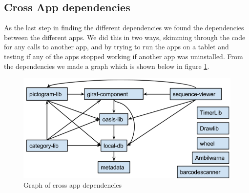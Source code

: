\subsection{Cross App dependencies}
As the last step in finding the different dependencies we found the dependencies between the different apps. We did this in two ways, skimming through the code for any calls to another app, and by trying to run the apps on a tablet and testing if any of the apps  stopped working if another app was uninstalled. From the dependencies we made a graph which is shown below in figure \ref{AppAppdependencies}.

\begin{figure}[H]
	\centering
	\includegraphics[width=0.8 \textwidth]{pictures/LibLibdependencies.png}
	\caption{Graph of cross app dependencies}
	\label{AppAppdependencies}
\end{figure}